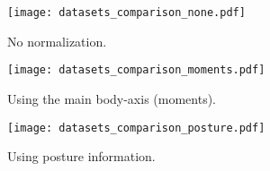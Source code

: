 \documentclass[multi=figure,9pt]{standalone}
\makeatletter
\renewenvironment{figure}%
{\def\@captype{figure}%
\minipage{\textwidth}}%
{\endminipage}
\makeatother
\begin{document}
\begin{figure}
    \centering
    \captionsetup[subfigure]{justification=centering}
    \begin{subfigure}[b]{0.325\textwidth}
            \centering
           \texttt{[image: datasets\_comparison\_none.pdf]}
            \caption{No normalization.}\label{fig:comparison_none}
    \end{subfigure}
    \begin{subfigure}[b]{0.325\textwidth}
           \centering
           	\texttt{[image: datasets\_comparison\_moments.pdf]}
            \caption{Using the main body-axis (moments).}\label{fig:normalization_moments}
    \end{subfigure}
    \begin{subfigure}[b]{0.325\textwidth}
            \centering\texttt{[image: datasets\_comparison\_posture.pdf]}
            \caption{Using posture information.}\label{fig:normalization_posture}
    \end{subfigure}
\end{figure}
\end{document}
